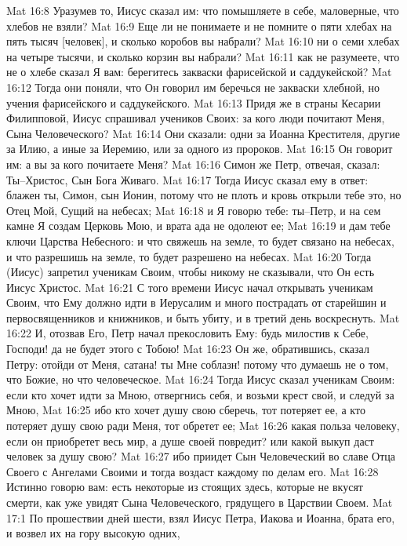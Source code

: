 Mat 16:8  Уразумев то, Иисус сказал им: что помышляете в себе, маловерные, что хлебов не взяли?
Mat 16:9  Еще ли не понимаете и не помните о пяти хлебах на пять тысяч [человек], и сколько коробов вы набрали?
Mat 16:10  ни о семи хлебах на четыре тысячи, и сколько корзин вы набрали?
Mat 16:11  как не разумеете, что не о хлебе сказал Я вам: берегитесь закваски фарисейской и саддукейской?
Mat 16:12  Тогда они поняли, что Он говорил им беречься не закваски хлебной, но учения фарисейского и саддукейского.
Mat 16:13  Придя же в страны Кесарии Филипповой, Иисус спрашивал учеников Своих: за кого люди почитают Меня, Сына Человеческого?
Mat 16:14  Они сказали: одни за Иоанна Крестителя, другие за Илию, а иные за Иеремию, или за одного из пророков.
Mat 16:15  Он говорит им: а вы за кого почитаете Меня?
Mat 16:16  Симон же Петр, отвечая, сказал: Ты--Христос, Сын Бога Живаго.
Mat 16:17  Тогда Иисус сказал ему в ответ: блажен ты, Симон, сын Ионин, потому что не плоть и кровь открыли тебе это, но Отец Мой, Сущий на небесах;
Mat 16:18  и Я говорю тебе: ты--Петр, и на сем камне Я создам Церковь Мою, и врата ада не одолеют ее;
Mat 16:19  и дам тебе ключи Царства Небесного: и что свяжешь на земле, то будет связано на небесах, и что разрешишь на земле, то будет разрешено на небесах.
Mat 16:20  Тогда (Иисус) запретил ученикам Своим, чтобы никому не сказывали, что Он есть Иисус Христос.
Mat 16:21  С того времени Иисус начал открывать ученикам Своим, что Ему должно идти в Иерусалим и много пострадать от старейшин и первосвященников и книжников, и быть убиту, и в третий день воскреснуть.
Mat 16:22  И, отозвав Его, Петр начал прекословить Ему: будь милостив к Себе, Господи! да не будет этого с Тобою!
Mat 16:23  Он же, обратившись, сказал Петру: отойди от Меня, сатана! ты Мне соблазн! потому что думаешь не о том, что Божие, но что человеческое.
Mat 16:24  Тогда Иисус сказал ученикам Своим: если кто хочет идти за Мною, отвергнись себя, и возьми крест свой, и следуй за Мною,
Mat 16:25  ибо кто хочет душу свою сберечь, тот потеряет ее, а кто потеряет душу свою ради Меня, тот обретет ее;
Mat 16:26  какая польза человеку, если он приобретет весь мир, а душе своей повредит? или какой выкуп даст человек за душу свою?
Mat 16:27  ибо приидет Сын Человеческий во славе Отца Своего с Ангелами Своими и тогда воздаст каждому по делам его.
Mat 16:28  Истинно говорю вам: есть некоторые из стоящих здесь, которые не вкусят смерти, как уже увидят Сына Человеческого, грядущего в Царствии Своем.
Mat 17:1  По прошествии дней шести, взял Иисус Петра, Иакова и Иоанна, брата его, и возвел их на гору высокую одних,

